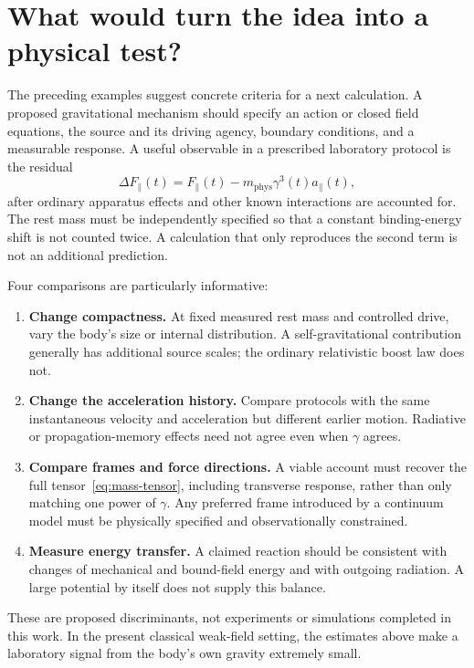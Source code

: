 \documentclass[11pt,a4paper]{article}
\numberwithin{equation}{section}
\newcommand{\phys}{\mathrm{phys}}
\begin{document}
\section{What would turn the idea into a physical test?}
\label{sec:tests}

The preceding examples suggest concrete criteria for a next calculation. A proposed gravitational mechanism should specify an action or closed field equations, the source and its driving agency, boundary conditions, and a measurable response. A useful observable in a prescribed laboratory protocol is the residual
\begin{equation}
 \Delta F_\parallel(t)=F_\parallel(t)
 -m_\phys\gamma^3(t)a_\parallel(t),
 \label{eq:residual}
\end{equation}
after ordinary apparatus effects and other known interactions are accounted for. The rest mass must be independently specified so that a constant binding-energy shift is not counted twice. A calculation that only reproduces the second term is not an additional prediction.

Four comparisons are particularly informative:
\begin{enumerate}
 \item \textbf{Change compactness.} At fixed measured rest mass and controlled drive, vary the body's size or internal distribution. A self-gravitational contribution generally has additional source scales; the ordinary relativistic boost law does not.
 \item \textbf{Change the acceleration history.} Compare protocols with the same instantaneous velocity and acceleration but different earlier motion. Radiative or propagation-memory effects need not agree even when $\gamma$ agrees.
 \item \textbf{Compare frames and force directions.} A viable account must recover the full tensor~\eqref{eq:mass-tensor}, including transverse response, rather than only matching one power of $\gamma$. Any preferred frame introduced by a continuum model must be physically specified and observationally constrained.
 \item \textbf{Measure energy transfer.} A claimed reaction should be consistent with changes of mechanical and bound-field energy and with outgoing radiation. A large potential by itself does not supply this balance.
\end{enumerate}
These are proposed discriminants, not experiments or simulations completed in this work. In the present classical weak-field setting, the estimates above make a laboratory signal from the body's own gravity extremely small.
\end{document}
